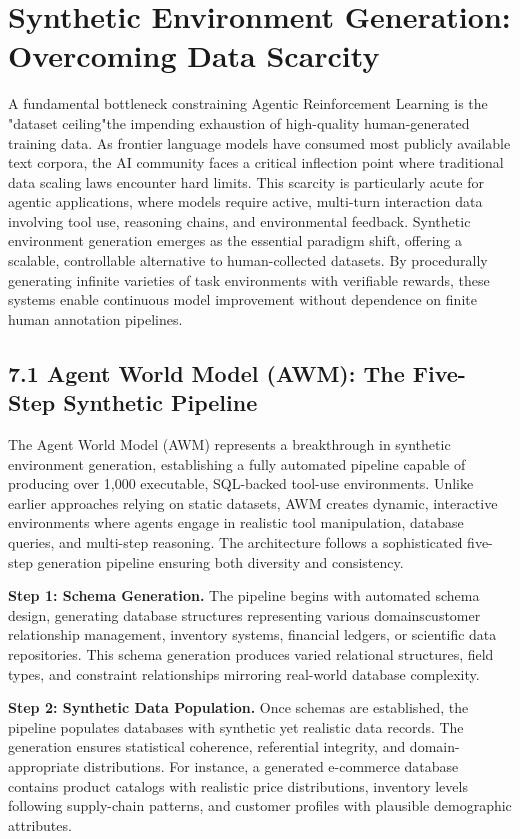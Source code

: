\section{ Synthetic Environment Generation: Overcoming Data Scarcity}

A fundamental bottleneck constraining Agentic Reinforcement Learning is the "dataset ceiling"the impending exhaustion of high-quality human-generated training data. As frontier language models have consumed most publicly available text corpora, the AI community faces a critical inflection point where traditional data scaling laws encounter hard limits. This scarcity is particularly acute for agentic applications, where models require active, multi-turn interaction data involving tool use, reasoning chains, and environmental feedback. Synthetic environment generation emerges as the essential paradigm shift, offering a scalable, controllable alternative to human-collected datasets. By procedurally generating infinite varieties of task environments with verifiable rewards, these systems enable continuous model improvement without dependence on finite human annotation pipelines.

\subsection{7.1 Agent World Model (AWM): The Five-Step Synthetic Pipeline}

The Agent World Model (AWM) represents a breakthrough in synthetic environment generation, establishing a fully automated pipeline capable of producing over 1,000 executable, SQL-backed tool-use environments. Unlike earlier approaches relying on static datasets, AWM creates dynamic, interactive environments where agents engage in realistic tool manipulation, database queries, and multi-step reasoning. The architecture follows a sophisticated five-step generation pipeline ensuring both diversity and consistency.

\textbf{Step 1: Schema Generation.} The pipeline begins with automated schema design, generating database structures representing various domainscustomer relationship management, inventory systems, financial ledgers, or scientific data repositories. This schema generation produces varied relational structures, field types, and constraint relationships mirroring real-world database complexity.

\textbf{Step 2: Synthetic Data Population.} Once schemas are established, the pipeline populates databases with synthetic yet realistic data records. The generation ensures statistical coherence, referential integrity, and domain-appropriate distributions. For instance, a generated e-commerce database contains product catalogs with realistic price distributions, inventory levels following supply-chain patterns, and customer profiles with plausible demographic attributes.

